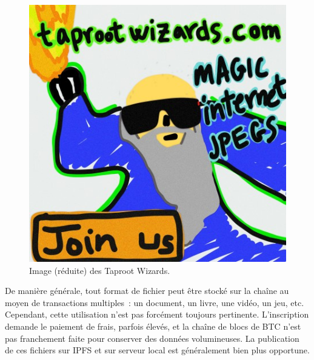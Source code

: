 \begin{figure}[h]
  \centering
  \includegraphics[scale=0.6]{img/taproot-wizards-small-0301e0480b374b32851a9462db29dc19fe830a7f7d7a88b81612b9d42099c0aei0.jpg}
  \caption{Image (réduite) des Taproot Wizards.}
  \label{fig:taproot-wizards}
\end{figure}

De manière générale, tout format de fichier peut être stocké sur la chaîne au moyen de transactions multiples~: un document, un livre, une vidéo, un jeu, etc. Cependant, cette utilisation n'est pas forcément toujours pertinente. L'inscription demande le paiement de frais, parfois élevés, et la chaîne de blocs de BTC n'est pas franchement faite pour conserver des données volumineuses. La publication de ces fichiers sur IPFS et sur serveur local est généralement bien plus opportune.

